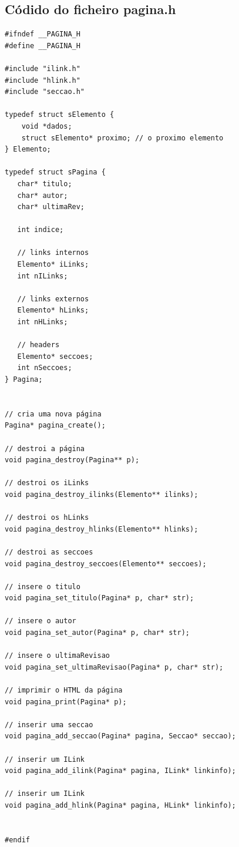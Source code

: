 \documentclass[11pt, a4paper, oneside]{article}
\begin{document}
\newpage
\subsection{Códido do ficheiro pagina.h}
\begin{verbatim}
#ifndef __PAGINA_H
#define __PAGINA_H

#include "ilink.h"
#include "hlink.h"
#include "seccao.h"

typedef struct sElemento {
    void *dados;
    struct sElemento* proximo; // o proximo elemento
} Elemento;

typedef struct sPagina {
   char* titulo;
   char* autor;
   char* ultimaRev;

   int indice;

   // links internos
   Elemento* iLinks;
   int nILinks;

   // links externos
   Elemento* hLinks;
   int nHLinks;
   
   // headers
   Elemento* seccoes;
   int nSeccoes;
} Pagina;


// cria uma nova página
Pagina* pagina_create();

// destroi a página
void pagina_destroy(Pagina** p);

// destroi os iLinks
void pagina_destroy_ilinks(Elemento** ilinks);

// destroi os hLinks
void pagina_destroy_hlinks(Elemento** hlinks);

// destroi as seccoes
void pagina_destroy_seccoes(Elemento** seccoes);

// insere o titulo
void pagina_set_titulo(Pagina* p, char* str);

// insere o autor
void pagina_set_autor(Pagina* p, char* str);

// insere o ultimaRevisao
void pagina_set_ultimaRevisao(Pagina* p, char* str);

// imprimir o HTML da página
void pagina_print(Pagina* p);

// inserir uma seccao
void pagina_add_seccao(Pagina* pagina, Seccao* seccao);

// inserir um ILink
void pagina_add_ilink(Pagina* pagina, ILink* linkinfo);

// inserir um ILink
void pagina_add_hlink(Pagina* pagina, HLink* linkinfo);


#endif

\end{verbatim}


\newpage
\end{document}
